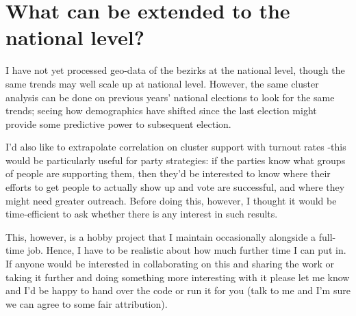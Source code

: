 \documentclass[amsmath,amssymb,nofootinbib,12pt,preprint]{revtex4}
\begin{document}
\section{What can be extended to the national level?}

I have not yet processed geo-data of the bezirks at the national level, though the same trends may well scale up at national level. However, the same cluster analysis can be done on previous years' national elections to look for the same trends; seeing how demographics have shifted since the last election might provide some predictive power to subsequent election.

I'd also like to extrapolate correlation on cluster support with turnout rates \--this would be particularly useful for party strategies: if the parties know what groups of people are supporting them, then they'd be interested to know where their efforts to get people to actually show up and vote are successful, and where they might need greater outreach. Before doing this, however, I thought it would be time-efficient to ask whether there is any interest in such results.

This, however, is a hobby project that I maintain occasionally alongside a full-time job. Hence, I have to be realistic about how much further time I can put in. If anyone would be interested in collaborating on this and sharing the work or taking it further and doing something more interesting with it please let me know and I'd be happy to hand over the code or run it for you (talk to me and I'm sure we can agree to some fair attribution).

\begin{thebibliography}{10}


\end{thebibliography}
\end{document}
